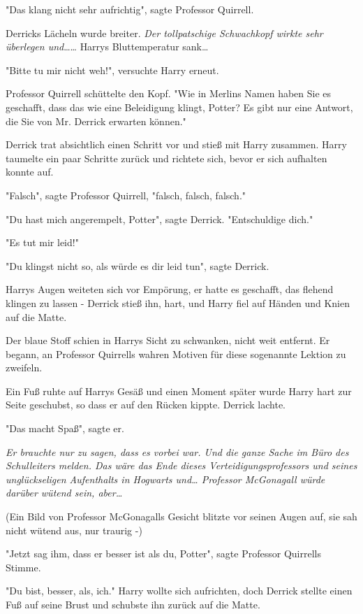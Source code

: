 {"Das klang nicht sehr aufrichtig", sagte Professor Quirrell.

Derricks Lächeln wurde breiter. \emph{Der tollpatschige Schwachkopf wirkte sehr überlegen und}…… Harrys Bluttemperatur sank…

"Bitte tu mir nicht weh!", versuchte Harry erneut.

Professor Quirrell schüttelte den Kopf. "Wie in Merlins Namen haben Sie es geschafft, dass das wie eine Beleidigung klingt, Potter? Es gibt nur eine Antwort, die Sie von Mr. Derrick erwarten können."

Derrick trat absichtlich einen Schritt vor und stieß mit Harry zusammen. Harry taumelte ein paar Schritte zurück und richtete sich, bevor er sich aufhalten konnte auf.

"Falsch", sagte Professor Quirrell, "falsch, falsch, falsch."

"Du hast mich angerempelt, Potter", sagte Derrick. "Entschuldige dich."

"Es tut mir leid!"

"Du klingst nicht so, als würde es dir leid tun", sagte Derrick.

Harrys Augen weiteten sich vor Empörung, er hatte es geschafft, das flehend klingen zu lassen - Derrick stieß ihn, hart, und Harry fiel auf Händen und Knien auf die Matte.

Der blaue Stoff schien in Harrys Sicht zu schwanken, nicht weit entfernt. Er begann, an Professor Quirrells wahren Motiven für diese sogenannte Lektion zu zweifeln.

Ein Fuß ruhte auf Harrys Gesäß und einen Moment später wurde Harry hart zur Seite geschubst, so dass er auf den Rücken kippte. Derrick lachte.

"Das macht Spaß", sagte er.

\emph{Er brauchte nur zu sagen, dass es vorbei war. Und die ganze Sache im Büro des Schulleiters melden. Das wäre das Ende dieses Verteidigungsprofessors und seines unglückseligen Aufenthalts in Hogwarts und… Professor McGonagall würde darüber wütend sein, aber…}

(Ein Bild von Professor McGonagalls Gesicht blitzte vor seinen Augen auf, sie sah nicht wütend aus, nur traurig -)

"Jetzt sag ihm, dass er besser ist als du, Potter", sagte Professor Quirrells Stimme.

"Du bist, besser, als, ich." Harry wollte sich aufrichten, doch Derrick stellte einen Fuß auf seine Brust und schubste ihn zurück auf die Matte.

}
